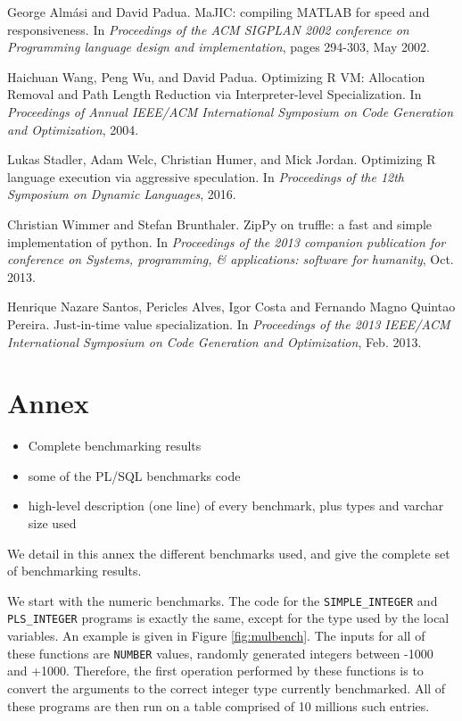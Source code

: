 \documentclass[twoside,11pt,a4paper]{article}
\newcommand{\pls}[1]{\texttt{#1}}
\newcommand{\plstype}[1]{\pls{#1}}
\newcommand{\oranum}{\plstype{NUMBER}}
\newcommand{\plsi}{\plstype{PLS\_INTEGER}}
\newcommand{\simpleint}{\plstype{SIMPLE\_INTEGER}}
\newcommand{\bibproceeding}[5]{
	\bibitem{#1}	%
		#2.		%
		#3.		%
		In \textit{#4},		%
		#5.		%
}
\begin{document}
\begin{thebibliography}{99}
\bibproceeding{majic}
	{George Almási and David Padua}
	{MaJIC: compiling MATLAB for speed and responsiveness}
	{Proceedings of the ACM SIGPLAN 2002 conference on Programming language design and implementation}
	{pages 294-303, May 2002}
	
\bibproceeding{rspec}
	{Haichuan Wang, Peng Wu, and David Padua}
	{Optimizing R VM: Allocation Removal and Path Length Reduction via Interpreter-level Specialization}
	{Proceedings of Annual IEEE/ACM International Symposium on Code Generation and Optimization}
	{2004}

\bibproceeding{fastr}
	{Lukas Stadler, Adam Welc, Christian Humer, and Mick Jordan}
	{Optimizing R language execution via aggressive speculation}
	{Proceedings of the 12th Symposium on Dynamic Languages}
	{2016}
	
\bibproceeding{zippy}
	{Christian Wimmer and Stefan Brunthaler}
	{ZipPy on truffle: a fast and simple implementation of python}
	{Proceedings of the 2013 companion publication for conference on Systems, programming, \& applications: software for humanity}
	{Oct. 2013}
	
\bibproceeding{jsvalue}
	{Henrique Nazare Santos, Pericles Alves, Igor Costa and Fernando Magno Quintao Pereira}
	{Just-in-time value specialization}
	{Proceedings of the 2013 IEEE/ACM International Symposium on Code Generation and Optimization}
	{Feb. 2013}

\end{thebibliography}

\newpage
\section*{Annex}
\label{sec:annex}
\thispagestyle{basic}

\begin{itemize}
\item Complete benchmarking results
\item some of the PL/SQL benchmarks code
\item high-level description (one line) of every benchmark, plus types and varchar size used
\end{itemize}

We detail in this annex the different benchmarks used, and give the complete set of benchmarking results.

We start with the numeric benchmarks. The code for the \simpleint{} and \plsi{} programs is exactly the same, except for the type used by the local variables. An example is given in Figure \ref{fig:mulbench}. The inputs for all of these functions are \oranum{} values, randomly generated integers between -1000 and +1000. Therefore, the first operation performed by these functions is to convert the arguments to the correct integer type currently benchmarked. All of these programs are then run on a table comprised of 10 millions such entries.
\end{document}
